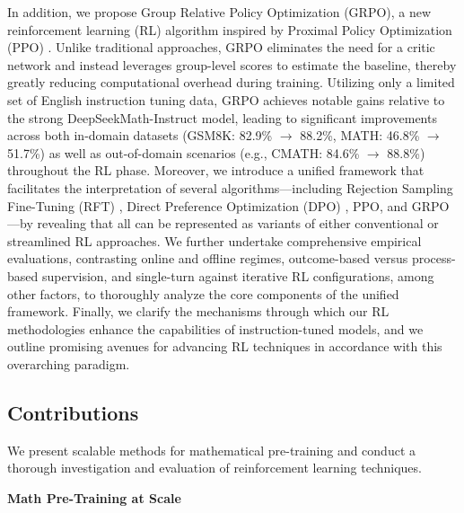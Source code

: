 In addition, we propose Group Relative Policy Optimization (GRPO), a new reinforcement learning (RL) algorithm inspired by Proximal Policy Optimization (PPO) \citep{schulman2017proximal}. Unlike traditional approaches, GRPO eliminates the need for a critic network and instead leverages group-level scores to estimate the baseline, thereby greatly reducing computational overhead during training. Utilizing only a limited set of English instruction tuning data, GRPO achieves notable gains relative to the strong DeepSeekMath-Instruct model, leading to significant improvements across both in-domain datasets (GSM8K: 82.9\% $\rightarrow$ 88.2\%, MATH: 46.8\% $\rightarrow$ 51.7\%) as well as out-of-domain scenarios (e.g., CMATH: 84.6\% $\rightarrow$ 88.8\%) throughout the RL phase. Moreover, we introduce a unified framework that facilitates the interpretation of several algorithms—including Rejection Sampling Fine-Tuning (RFT) \citep{yuan2023scaling}, Direct Preference Optimization (DPO) \citep{dpo}, PPO, and GRPO—by revealing that all can be represented as variants of either conventional or streamlined RL approaches. We further undertake comprehensive empirical evaluations, contrasting online and offline regimes, outcome-based versus process-based supervision, and single-turn against iterative RL configurations, among other factors, to thoroughly analyze the core components of the unified framework. Finally, we clarify the mechanisms through which our RL methodologies enhance the capabilities of instruction-tuned models, and we outline promising avenues for advancing RL techniques in accordance with this overarching paradigm.

\subsection{Contributions}
We present scalable methods for mathematical pre-training and conduct a thorough investigation and evaluation of reinforcement learning techniques.

\textbf{Math Pre-Training at Scale}

